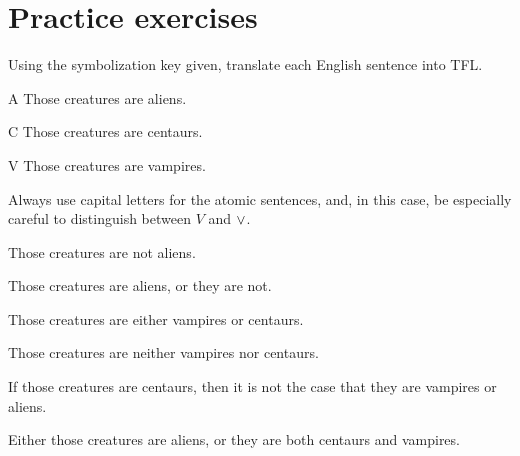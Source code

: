 






\section{Practice exercises}
\setcounter{ProbPart}{0}

\problempart Using the symbolization key given, translate each English sentence into TFL.\label{pr.monkeysuits}
	\begin{ekey}
		\item[A] Those creatures are aliens. 
		\item[C] Those creatures are centaurs. 
		\item[V] Those creatures are vampires.
	\end{ekey}
Always use capital letters for the atomic sentences, and, in this case, be especially careful to distinguish between $V$ and $\vee$.

\begin{earg}
\item Those creatures are not aliens.
\item Those creatures are aliens, or they are not.
\item Those creatures are either vampires or centaurs.
\item Those creatures are neither vampires nor centaurs.
\item If those creatures are centaurs, then it is not the case that they are vampires or aliens.
\item Either those creatures are aliens, or they are both centaurs and vampires.
\end{earg}

